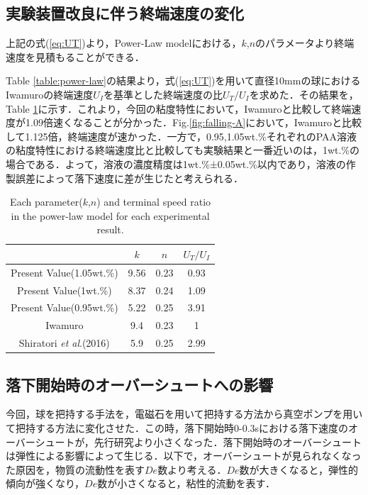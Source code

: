 \subsection{実験装置改良に伴う終端速度の変化}

上記の式(\ref{eq:UT})より，Power-Law modelにおける，$k$,$n$のパラメータより終端速度を見積もることができる．

Table \ref{table:power-law}の結果より，式(\ref{eq:UT})を用いて直径10mmの球におけるIwamuro\cite{ref:8}の終端速度$U_I$を基準とした終端速度の比$U_T/U_{I}$を求めた．その結果を，Table \ref{table:UT}に示す．これより，今回の粘度特性において，Iwamuro\cite{ref:8}と比較して終端速度が1.09倍速くなることが分かった．Fig.\ref{fig:falling-A}において，Iwamuro\cite{ref:8}と比較して1.125倍，終端速度が速かった．一方で，0.95,1.05wt.\%それぞれのPAA溶液の粘度特性における終端速度比と比較しても実験結果と一番近いのは，1wt.\%の場合である．よって，溶液の濃度精度は1wt.\%±0.05wt.\%以内であり，溶液の作製誤差によって落下速度に差が生じたと考えられる．

\begin{table}[h]
    \centering
    \caption{Each parameter($k$,$n$) and terminal speed ratio in the power-law model for each experimental result.}
    \label{table:UT}
    \begin{tabular}{c|c|c|c} \hline
                                                     & $k$  & $n$  & $U_T/U_{I}$ \\ \hline \hline
        Present Value(1.05wt.\%)                     & 9.56 & 0.23 & 0.93        \\
        Present Value(1wt.\%)                        & 8.37 & 0.24 & 1.09        \\
        Present Value(0.95wt.\%)                     & 5.22 & 0.25 & 3.91        \\
        Iwamuro\cite{ref:8}                          & 9.4  & 0.23 & 1           \\
        Shiratori \textit{et al}.(2016)\cite{ref:10} & 5.9  & 0.25 & 2.99        \\ \hline
    \end{tabular}
\end{table}

\newpage

\subsection{落下開始時のオーバーシュートへの影響}
\label{sec:dis-de}

今回，球を把持する手法を，電磁石を用いて把持する方法から真空ポンプを用いて把持する方法に変化させた．この時，落下開始時0-0.3sにおける落下速度のオーバーシュートが，先行研究\cite{ref:8,ref:9}より小さくなった．落下開始時のオーバーシュートは弾性による影響によって生じる\cite{ref:12}．以下で，オーバーシュートが見られなくなった原因を，物質の流動性を表す$De$数より考える．$De$数が大きくなると，弾性的傾向が強くなり，$De$数が小さくなると，粘性的流動を表す．

